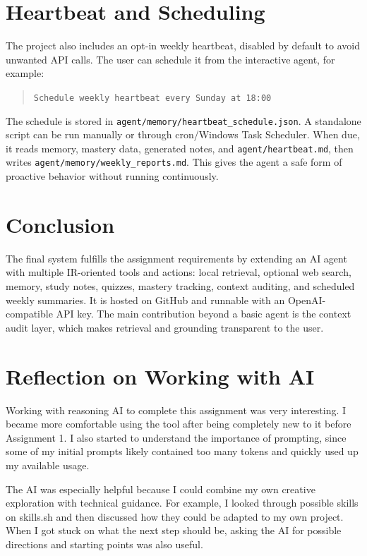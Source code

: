 \documentclass[10pt,a4paper]{article}
\begin{document}
\section{Heartbeat and Scheduling}

The project also includes an opt-in weekly heartbeat, disabled by default to avoid unwanted API calls. The user can schedule it from the interactive agent, for example:

\begin{quote}
\texttt{Schedule weekly heartbeat every Sunday at 18:00}
\end{quote}

The schedule is stored in \texttt{agent/memory/heartbeat\_schedule.json}. A standalone script can be run manually or through cron/Windows Task Scheduler. When due, it reads memory, mastery data, generated notes, and \texttt{agent/heartbeat.md}, then writes \texttt{agent/memory/weekly\_reports.md}. This gives the agent a safe form of proactive behavior without running continuously.

\section{Conclusion}

The final system fulfills the assignment requirements by extending an AI agent with multiple IR-oriented tools and actions: local retrieval, optional web search, memory, study notes, quizzes, mastery tracking, context auditing, and scheduled weekly summaries. It is hosted on GitHub and runnable with an OpenAI-compatible API key. The main contribution beyond a basic agent is the context audit layer, which makes retrieval and grounding transparent to the user.

\section*{Reflection on Working with AI}

Working with reasoning AI to complete this assignment was very interesting. I became more comfortable using the tool after being completely new to it before Assignment 1. I also started to understand the importance of prompting, since some of my initial prompts likely contained too many tokens and quickly used up my available usage.

The AI was especially helpful because I could combine my own creative exploration with technical guidance. For example, I looked through possible skills on skills.sh and then discussed how they could be adapted to my own project. When I got stuck on what the next step should be, asking the AI for possible directions and starting points was also useful.
\end{document}
